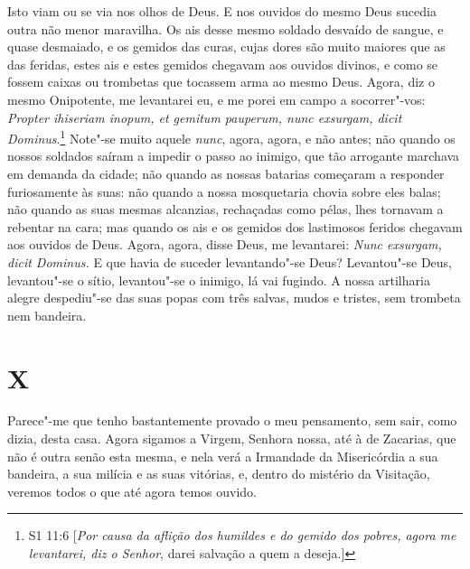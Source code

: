 Isto viam ou se via nos olhos de Deus. E nos ouvidos do mesmo Deus
sucedia outra não menor maravilha. Os ais desse mesmo soldado desvaído
de sangue, e quase desmaiado, e os gemidos das curas, cujas dores são
muito maiores que as das feridas, estes ais e estes gemidos chegavam aos
ouvidos divinos, e como se fossem caixas ou trombetas que tocassem arma
ao mesmo Deus. Agora, diz o mesmo Onipotente, me levantarei eu, e me
porei em campo a socorrer"-vos: \emph{Propter ihiseriam inopum, et
gemitum pauperum, nunc exsurgam, dicit Dominus}.\footnote{S1 11:6 [\textit{Por causa da aflição dos humildes e do gemido dos pobres, agora me levantarei, diz o Senhor}, darei salvação a quem a deseja.]} Note"-se
muito aquele \emph{nunc}, agora, agora, e não antes; não quando os
nossos soldados saíram a impedir o passo ao inimigo, que tão arrogante
marchava em demanda da cidade; não quando as nossas batarias começaram a
responder furiosamente às suas: não quando a nossa mosquetaria chovia
sobre eles balas; não quando as suas mesmas alcanzias, rechaçadas como
pélas, lhes tornavam a rebentar na cara; mas quando os ais e os gemidos
dos lastimosos feridos chegavam aos ouvidos de Deus.
Agora, agora, disse Deus, me levantarei: \emph{Nunc exsurgam, dicit
Dominus.} E que havia de suceder levantando"-se Deus? Levantou"-se Deus,
levantou"-se o sítio, levantou"-se o inimigo, lá vai fugindo. A nossa
artilharia alegre despediu"-se das suas popas com três salvas, mudos e
tristes, sem trombeta nem bandeira.

\section*{X}

Parece"-me que tenho bastantemente provado o meu pensamento, sem sair,
como dizia, desta casa. Agora sigamos a Virgem, Senhora nossa, até à de
Zacarias, que não é outra senão esta mesma, e nela verá a Irmandade da
Misericórdia a sua bandeira, a sua milícia e as suas vitórias, e, dentro
do mistério da Visitação, veremos todos o que até agora temos
ouvido.

